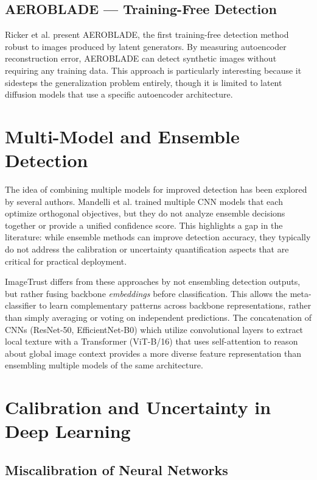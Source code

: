 \subsection{AEROBLADE --- Training-Free Detection}\label{sec:aeroblade}

Ricker et al. \cite{ricker2024aeroblade} present AEROBLADE, the first training-free detection method robust to images produced by latent generators. By measuring autoencoder reconstruction error, AEROBLADE can detect synthetic images without requiring any training data. This approach is particularly interesting because it sidesteps the generalization problem entirely, though it is limited to latent diffusion models that use a specific autoencoder architecture.


\section{Multi-Model and Ensemble Detection}\label{sec:ensemble}

The idea of combining multiple models for improved detection has been explored by several authors. Mandelli et al. \cite{mandelli2022detecting} trained multiple CNN models that each optimize orthogonal objectives, but they do not analyze ensemble decisions together or provide a unified confidence score. This highlights a gap in the literature: while ensemble methods can improve detection accuracy, they typically do not address the calibration or uncertainty quantification aspects that are critical for practical deployment.

ImageTrust differs from these approaches by not ensembling detection outputs, but rather fusing backbone \textit{embeddings} before classification. This allows the meta-classifier to learn complementary patterns across backbone representations, rather than simply averaging or voting on independent predictions. The concatenation of CNNs (ResNet-50, EfficientNet-B0) which utilize convolutional layers to extract local texture with a Transformer (ViT-B/16) that uses self-attention to reason about global image context provides a more diverse feature representation than ensembling multiple models of the same architecture.


\section{Calibration and Uncertainty in Deep Learning}\label{sec:calib-related}

\subsection{Miscalibration of Neural Networks}\label{sec:miscalibration}

